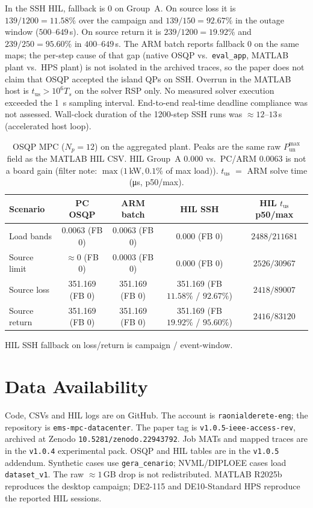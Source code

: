 \documentclass{ieeeaccess}
\begin{document}
In the SSH HIL, fallback is 0 on Group~A. On source loss it is $139/1200=11.58\%$ over the campaign and $139/150=92.67\%$ in the outage window ($500$--$649$\,s). On source return it is $239/1200=19.92\%$ and $239/250=95.60\%$ in $400$--$649$\,s. The ARM batch reports fallback 0 on the same maps; the per-step cause of that gap (native OSQP vs.\ \texttt{eval\_app}, MATLAB plant vs.\ HPS plant) is not isolated in the archived traces, so the paper does not claim that OSQP accepted the island QPs on SSH. Overrun in the MATLAB host is $t_{\mathrm{us}}>10^{6}T_s$ on the solver RSP only. No measured solver execution exceeded the \SI{1}{\second} sampling interval. End-to-end real-time deadline compliance was not assessed. Wall-clock duration of the 1200-step SSH runs was $\approx 12$--$13$\,s (accelerated host loop).

\begin{table}[!t]
\centering
\caption{OSQP MPC ($N_p{=}12$) on the aggregated plant. Peaks are the same raw $P_{\mathrm{un}}^{\max}$ field as the MATLAB HIL CSV. HIL Group~A $0.000$ vs.\ PC/ARM $0.0063$ is not a board gain (filter note: $\max(1$\,kW$,0.1\%$ of max load$)$). $t_{\mathrm{us}}$ $=$ ARM solve time (\si{\micro\second}, p50/max).}
\label{tab:hil_osqp}
{\footnotesize
\begin{tabular}{@{}lcccc@{}}
\toprule
Scenario & PC OSQP & ARM batch & HIL SSH & HIL $t_{\mathrm{us}}$ p50/max \\
\midrule
Load bands & 0.0063 (FB 0) & 0.0063 (FB 0) & 0.000 (FB 0) & $2488/211681$ \\
Source limit & $\approx 0$ (FB 0) & 0.0003 (FB 0) & 0.000 (FB 0) & $2526/30967$ \\
Source loss & 351.169 (FB 0) & 351.169 (FB 0) & 351.169 (FB $11.58\%$ / $92.67\%$) & $2418/89007$ \\
Source return & 351.169 (FB 0) & 351.169 (FB 0) & 351.169 (FB $19.92\%$ / $95.60\%$) & $2416/83120$ \\
\bottomrule
\end{tabular}}
\end{table}

HIL SSH fallback on loss/return is campaign / event-window.

\section{Data Availability}
\label{sec:data}

Code, CSVs and HIL logs are on GitHub. The account is \texttt{raonialderete-eng}; the repository is \texttt{ems-mpc-datacenter}. The paper tag is \texttt{v1.0.5}-\texttt{ieee-access-rev}, archived at Zenodo \texttt{10.5281/}\allowbreak\texttt{zenodo.22943792}. Job MATs and mapped traces are in the \texttt{v1.0.4} experimental pack. OSQP and HIL tables are in the \texttt{v1.0.5} addendum. Synthetic cases use \texttt{gera\_cenario}; NVML/DIPLOEE cases load \texttt{dataset\_v1}. The raw $\approx 1$\,GB drop is not redistributed. MATLAB R2025b reproduces the desktop campaign; DE2-115 and DE10-Standard HPS reproduce the reported HIL sessions.
\end{document}
